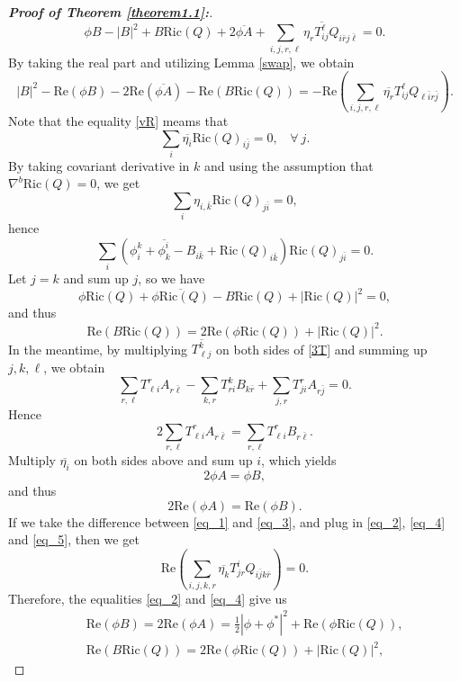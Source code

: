 \documentclass{amsart}
\numberwithin{equation}{section}
\theoremstyle{definition}
\renewcommand{\1}{\mathds{1}}
\renewcommand{\>}{\rightarrow}
\begin{document}
\begin{proof}[{\bf Proof of Theorem \ref{theorem1.1}:}]
\[ \phi B - |B|^2 +  B \mathrm{Ric}(Q) + 2 \overline{\phi A}
+ \sum_{i,j,r,\ell} \eta_r \overline{T^{\ell}_{ij}} Q_{i\bar{r}j\bar{\ell}}=0. \]
By taking the real part and utilizing Lemma \ref{swap}, we obtain
\begin{equation}\label{eq_3}
|B|^2 - \mathrm{Re}(\phi B) - 2 \mathrm{Re}(\overline{\phi A}) -  \mathrm{Re}( B \mathrm{Ric}(Q))
=-  \mathrm{Re} \left( \sum_{i,j,r,\ell} \overline{\eta_r} T^{\ell}_{ij}Q_{\ell \bar{i} r \bar{j}} \right).
\end{equation}
Note that the equality \eqref{vR} meams that
\[\sum_{i}\overline{\eta_i}\mathrm{Ric}(Q)_{i\bar{j}}=0, \ \ \ \ \forall \ j.\]
By taking covariant derivative in $k$ and using the assumption that  $\nabla^b \mathrm{Ric}(Q)=0$, we get
\[\sum_i \eta_{i,\bar{k}} \mathrm{Ric}(Q)_{j \bar{i}}=0,\]
hence
\[ \sum_i \left( \phi_i^k + \overline{\phi_k^i} - B_{i\bar{k}} +  \mathrm{Ric}(Q)_{i\bar{k}}\right) \mathrm{Ric}(Q)_{j \bar{i}}=0. \]
Let $j=k$ and sum up $j$, so we have
\[ \phi \mathrm{Ric}(Q) + \overline{\phi \mathrm{Ric}(Q)} - B \mathrm{Ric}(Q) + |\mathrm{Ric}(Q)|^2 =0, \]
and thus
\begin{equation}\label{eq_4}
\mathrm{Re}(B\mathrm{Ric}(Q)) = 2 \mathrm{Re}(\phi \mathrm{Ric}(Q))  + |\mathrm{Ric}(Q)|^2 .
\end{equation}
In the meantime, by multiplying $\overline{T^k_{\ell j}}$ on both sides of \eqref{3T} and summing up $j,k,\ell$, we obtain
\[ \sum_{r,\ell} T^r_{\ell i}A_{r \bar{\ell}} - \sum_{k,r} T^k_{r i}B_{k \bar{r}} +  \sum_{j,r}T^r_{ji}A_{r\bar{j}}=0.\]
Hence
\begin{equation}\label{TBTA}
2 \sum_{r,\ell}T^r_{\ell i}A_{r \bar{\ell}} = \sum_{r,\ell} T^r_{\ell i}B_{r \bar{\ell}}.
\end{equation}
Multiply $\overline{\eta_i}$ on both sides above and sum up $i$, which yields
\[2 \phi A = \phi B,\]
and thus
\begin{equation}\label{eq_5}
2 \mathrm{Re} (\phi A) = \mathrm{Re} (\phi B).
\end{equation}
If we take the difference between \eqref{eq_1} and \eqref{eq_3}, and plug in  \eqref{eq_2}, \eqref{eq_4} and \eqref{eq_5}, then we get
\[ \mathrm{Re} \left(\sum_{i,j,k,r} \overline{\eta_k} T^i_{jr} Q_{i\bar{j}k\bar{r}}\right)=0.\]
Therefore, the equalities \eqref{eq_2} and \eqref{eq_4}  give us
\begin{eqnarray*}
&& \mathrm{Re}(\phi B)= 2\mathrm{Re}(\phi A)= \frac{1}{2}|\phi+\phi^*|^2 +  \mathrm{Re}(\phi  \mathrm{Ric}(Q)),\\
&& \mathrm{Re}(B\mathrm{Ric}(Q)) = 2 \mathrm{Re}(\phi \mathrm{Ric}(Q))  + |\mathrm{Ric}(Q)|^2,

\end{eqnarray*}
\end{proof}
\end{document}
